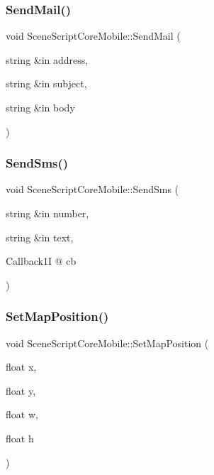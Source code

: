 \hypertarget{class_scene_script_core_mobile_ae8a8eebd4be1acb3a9901048c0277926}{}\label{class_scene_script_core_mobile_ae8a8eebd4be1acb3a9901048c0277926} 
\subsubsection{\texorpdfstring{Send\+Mail()}{SendMail()}}
{\footnotesize\ttfamily void Scene\+Script\+Core\+Mobile\+::\+Send\+Mail (\begin{DoxyParamCaption}\item[{string \&in}]{address,  }\item[{string \&in}]{subject,  }\item[{string \&in}]{body }\end{DoxyParamCaption})}

\hypertarget{class_scene_script_core_mobile_ac46247fdf455476f8373413f3d23f75b}{}\label{class_scene_script_core_mobile_ac46247fdf455476f8373413f3d23f75b} 
\subsubsection{\texorpdfstring{Send\+Sms()}{SendSms()}}
{\footnotesize\ttfamily void Scene\+Script\+Core\+Mobile\+::\+Send\+Sms (\begin{DoxyParamCaption}\item[{string \&in}]{number,  }\item[{string \&in}]{text,  }\item[{Callback1I @}]{cb }\end{DoxyParamCaption})}

\hypertarget{class_scene_script_core_mobile_aa2e383859b3fa9593c305988f5b6b92b}{}\label{class_scene_script_core_mobile_aa2e383859b3fa9593c305988f5b6b92b} 
\subsubsection{\texorpdfstring{Set\+Map\+Position()}{SetMapPosition()}}
{\footnotesize\ttfamily void Scene\+Script\+Core\+Mobile\+::\+Set\+Map\+Position (\begin{DoxyParamCaption}\item[{float}]{x,  }\item[{float}]{y,  }\item[{float}]{w,  }\item[{float}]{h }\end{DoxyParamCaption})}

